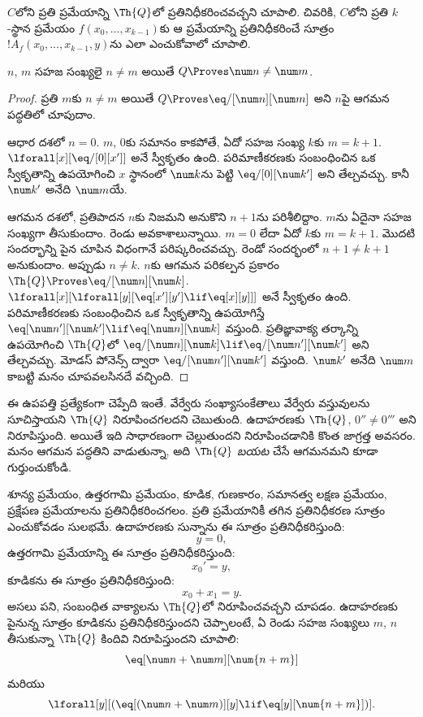 \documentclass[../../../include/open-logic-section]{subfiles}
\begin{document}

$C$లోని ప్రతి ప్రమేయాన్ని $\Th{Q}$లో ప్రతినిధీకరించవచ్చని చూపాలి. చివరికి, $C$లోని ప్రతి $k$-స్థాన ప్రమేయం $f(x_0,\dots,x_{k-1})$కు ఆ ప్రమేయాన్ని ప్రతినిధీకరించే సూత్రం $!A_f(x_0,\dots,x_{k-1},y)$ను ఎలా ఎంచుకోవాలో చూపాలి.

\begin{lem}
$n$, $m$ సహజ సంఖ్యలై $n \neq m$ అయితే $Q \Proves \num
n \neq \num m$.
\end{lem}

\begin{proof}
ప్రతి $m$కు $n \neq m$ అయితే $Q \Proves \eq/[\num n][\num m]$ అని $n$పై ఆగమన పద్ధతిలో చూపుదాం.

ఆధార దశలో $n = 0$. $m$, $0$కు సమానం కాకపోతే, ఏదో సహజ సంఖ్య $k$కు $m = k +
1$. $\lforall[x][\eq/[0][x']]$ అనే స్వీకృతం ఉంది. పరిమాణీకరణకు సంబంధించిన ఒక స్వీకృతాన్ని ఉపయోగించి $x$ స్థానంలో $\num k$ను పెట్టి $\eq/[0][\num k']$ అని తేల్చవచ్చు. కానీ $\num k'$ అనేది $\num m$యే.

ఆగమన దశలో, ప్రతిపాదన $n$కు నిజమని అనుకొని $n+1$ను పరిశీలిద్దాం. $m$ను ఏదైనా సహజ సంఖ్యగా తీసుకుందాం. రెండు అవకాశాలున్నాయి. $m = 0$ లేదా ఏదో $k$కు $m = k+1$. మొదటి సందర్భాన్ని పైన చూపిన విధంగానే పరిష్కరించవచ్చు. రెండో సందర్భంలో $n+1 \neq
k+1$ అనుకుందాం. అప్పుడు $n \neq k$. $n$కు ఆగమన పరికల్పన ప్రకారం $\Th{Q} \Proves \eq/[\num n][\num k]$. $\lforall[x][\lforall[y][\eq[x'][y'] \lif \eq[x][y]]]$ అనే స్వీకృతం ఉంది. పరిమాణీకరణకు సంబంధించిన ఒక స్వీకృతాన్ని ఉపయోగిస్తే $\eq[\num n'][\num k'] \lif \eq[\num n][\num
  k]$ వస్తుంది. ప్రతిజ్ఞావాక్య తర్కాన్ని ఉపయోగించి $\Th{Q}$లో $\eq/[\num n][\num k] \lif \eq/[\num n'][\num k']$ అని తేల్చవచ్చు. మోడస్ పోనెన్స్ ద్వారా $\eq/[\num n'][\num k']$ వస్తుంది. $\num k'$ అనేది $\num m$ కాబట్టి మనం చూపవలసినదే వచ్చింది.
\end{proof}

ఈ ఉపపత్తి ప్రత్యేకంగా చెప్పేది ఇంతే. వేర్వేరు సంఖ్యాసంకేతాలు వేర్వేరు వస్తువులను సూచిస్తాయని $\Th{Q}$ నిరూపించగలదని చెబుతుంది. ఉదాహరణకు $\Th{Q}$, $0'' \neq 0'''$ అని నిరూపిస్తుంది. అయితే ఇది సాధారణంగా చెల్లుతుందని నిరూపించడానికి కొంత జాగ్రత్త అవసరం. మనం ఆగమన పద్ధతిని వాడుతున్నా, అది $\Th{Q}$ \emph{బయట} చేసే ఆగమనమని కూడా గుర్తుంచుకోండి.

శూన్య ప్రమేయం, ఉత్తరగామి ప్రమేయం, కూడిక, గుణకారం, సమానత్వ లక్షణ ప్రమేయం, ప్రక్షేపణ ప్రమేయాలను ప్రతినిధీకరించగలం. ప్రతి ప్రమేయానికీ తగిన ప్రతినిధీకరణ సూత్రం ఎంచుకోవడం సులభమే. ఉదాహరణకు సున్నాను ఈ సూత్రం ప్రతినిధీకరిస్తుంది:
\[
y = 0,
\]
ఉత్తరగామి ప్రమేయాన్ని ఈ సూత్రం ప్రతినిధీకరిస్తుంది:
\[
x_0' = y,
\]
కూడికను ఈ సూత్రం ప్రతినిధీకరిస్తుంది:
\[
x_0 + x_1 = y.
\]
అసలు పని, సంబంధిత వాక్యాలను $\Th{Q}$లో నిరూపించవచ్చని చూపడం. ఉదాహరణకు పైనున్న సూత్రం కూడికను ప్రతినిధీకరిస్తుందని చెప్పాలంటే, ఏ రెండు సహజ సంఖ్యలు $m$, $n$ తీసుకున్నా $\Th{Q}$ కిందివి నిరూపిస్తుందని చూపాలి:
\[
\eq[\num n + \num m][\num {n+m}]
\]
మరియు
\[
\lforall[y][(\eq[(\num n + \num m)][y] \lif \eq[y][\num {n+m}])].
\]
\end{document}
